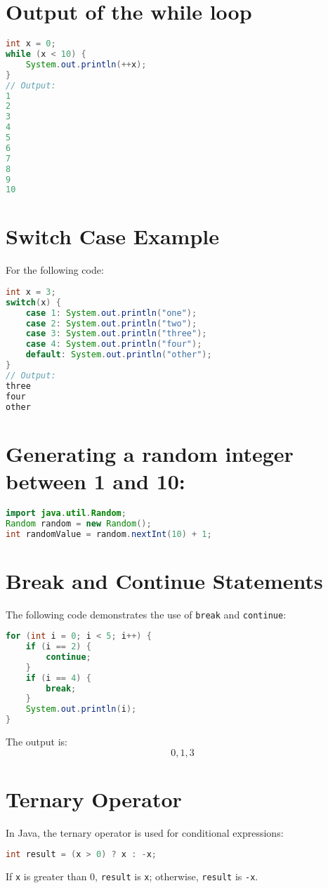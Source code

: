 \documentclass{article}
\begin{document}
\section{Output of the while loop}
\begin{lstlisting}[language=Java]
int x = 0;
while (x < 10) {
    System.out.println(++x);
}
// Output:
1
2
3
4
5
6
7
8
9
10
\end{lstlisting}

\section{Switch Case Example}
For the following code:
\begin{lstlisting}[language=Java]
int x = 3;
switch(x) {
    case 1: System.out.println("one");
    case 2: System.out.println("two");
    case 3: System.out.println("three");
    case 4: System.out.println("four");
    default: System.out.println("other");
}
// Output:
three
four
other
\end{lstlisting}

\section{Generating a random integer between 1 and 10:}
\begin{lstlisting}[language=Java]
import java.util.Random;
Random random = new Random();
int randomValue = random.nextInt(10) + 1;
\end{lstlisting}

\section*{Break and Continue Statements}
The following code demonstrates the use of \texttt{break} and \texttt{continue}:
\begin{lstlisting}[language=Java]
for (int i = 0; i < 5; i++) {
    if (i == 2) {
        continue;
    }
    if (i == 4) {
        break;
    }
    System.out.println(i);
}
\end{lstlisting}
The output is:
\[
0, 1, 3
\]

\section*{Ternary Operator}
In Java, the ternary operator is used for conditional expressions:
\begin{lstlisting}[language=Java]
int result = (x > 0) ? x : -x;
\end{lstlisting}
If \texttt{x} is greater than 0, \texttt{result} is \texttt{x}; otherwise, \texttt{result} is \texttt{-x}.
\end{document}
